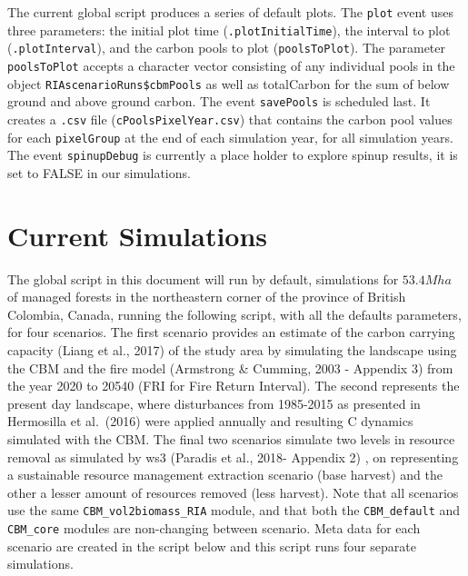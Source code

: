 \documentclass[
]{article}
\begin{document}
The current global script produces a series of default plots. The
\texttt{plot} event uses three parameters: the initial plot time
(\texttt{.plotInitialTime}), the interval to plot
(\texttt{.plotInterval}), and the carbon pools to plot
(\texttt{poolsToPlot}). The parameter \texttt{poolsToPlot} accepts a
character vector consisting of any individual pools in the object
\texttt{RIAscenarioRuns\$cbmPools} as well as totalCarbon for the sum of
below ground and above ground carbon. The event \texttt{savePools} is
scheduled last. It creates a \texttt{.csv} file
(\texttt{cPoolsPixelYear.csv}) that contains the carbon pool values for
each \texttt{pixelGroup} at the end of each simulation year, for all
simulation years. The event \texttt{spinupDebug} is currently a place
holder to explore spinup results, it is set to FALSE in our simulations.

\hypertarget{current-simulations}{%
\section{Current Simulations}\label{current-simulations}}

The global script in this document will run by default, simulations for
\(53.4Mha\) of managed forests in the northeastern corner of the
province of British Colombia, Canada, running the following script, with
all the defaults parameters, for four scenarios. The first scenario
provides an estimate of the carbon carrying capacity (Liang et al.,
2017) of the study area by simulating the landscape using the CBM and
the fire model (Armstrong \& Cumming, 2003 - Appendix 3) from the year
2020 to 20540 (FRI for Fire Return Interval). The second represents the
present day landscape, where disturbances from 1985-2015 as presented in
Hermosilla et al.~(2016) were applied annually and resulting C dynamics
simulated with the CBM. The final two scenarios simulate two levels in
resource removal as simulated by ws3 (Paradis et al., 2018- Appendix 2)
, on representing a sustainable resource management extraction scenario
(base harvest) and the other a lesser amount of resources removed (less
harvest). Note that all scenarios use the same
\texttt{CBM\_vol2biomass\_RIA} module, and that both the
\texttt{CBM\_default} and \texttt{CBM\_core} modules are non-changing
between scenario. Meta data for each scenario are created in the script
below and this script runs four separate simulations.
\end{document}
